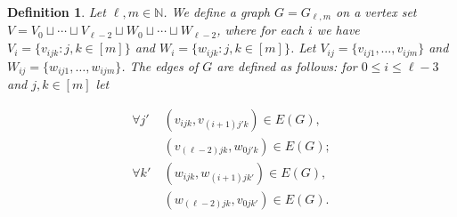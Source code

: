 \documentclass[12pt]{article}
\newtheorem{defn}{Definition}
\begin{document}
    \begin{defn} \label{Glm definition}
        Let $\ell,m\in\mathbb N$. We define a graph $G=G_{\ell,m}$ on a vertex set $V=V_0\sqcup\cdots\sqcup V_{\ell-2}\sqcup W_0\sqcup\cdots\sqcup W_{\ell-2}$, where for each $i$ we have $V_i=\{v_{ijk}:j,k\in[m]\}$ and $W_i=\{w_{ijk}:j,k\in[m]\}$. Let $V_{ij}=\{v_{ij1},\ldots,v_{ijm}\}$ and $W_{ij}=\{w_{ij1},\ldots,w_{ijm}\}$. The edges of $G$ are defined as follows: for $0\le i\le\ell-3$ and $j,k\in[m]$ let 

    \begin{equation}\label{graph equation}\begin{aligned}\forall j'&\ (v_{ijk},v_{(i+1)j'k})\in E(G),\\
    &\ (v_{(\ell-2)jk}, w_{0j'k}) \in E(G);\\
    \forall k'&\ (w_{ijk}, w_{(i+1)jk'})\in E(G),\\
    &\ (w_{(\ell-2)jk}, v_{0jk'}) \in E(G) .\end{aligned}\end{equation}
        \end{defn}
\end{document}
